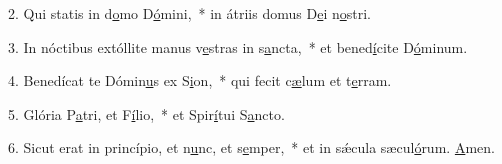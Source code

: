 2. Qui statis in d\uline{o}mo D\uline{ó}mini,~* in átriis domus D\uline{e}i n\uline{o}stri.\par 
3. In nóctibus extóllite manus v\uline{e}stras in s\uline{a}ncta,~* et bened\uline{í}cite D\uline{ó}minum.\par 
4. Benedícat te Dómin\uline{u}s ex S\uline{i}on,~* qui fecit c\uline{æ}lum et t\uline{e}rram.\par 
5. Glória P\uline{a}tri, et F\uline{í}lio,~* et Spir\uline{í}tui S\uline{a}ncto.\par 
6. Sicut erat in princípio, et n\uline{u}nc, et s\uline{e}mper,~* et in sǽcula sæcul\uline{ó}rum. \uline{A}men.\par 
